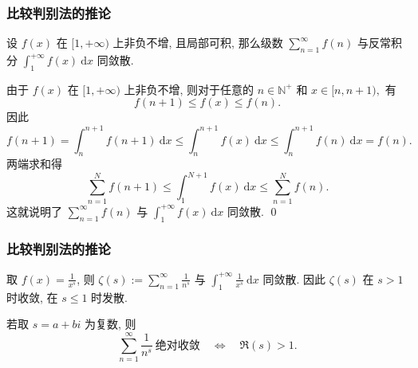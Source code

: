 
\begin{frame}
\frametitle{比较判别法的推论}

\begin{cor}
设 $f(x)$ 在 $[1, +\infty)$ 上非负不增, 且局部可积, 那么级数 $\displaystyle \sum_{n=1}^{\infty} f(n)$ 与反常积分 $\displaystyle \int_1^{+\infty} f(x) ~ \mathrm{d} x$ 同敛散.
\end{cor}

\pause

\startproof[bg=yellow, fg=red]
由于 $f(x)$ 在 $[1, +\infty)$ 上非负不增, 则对于任意的 $n \in \mathbb{N}^+$ 和 $x \in [n, n+1),$ 有
\[
f(n+1) \leqslant f(x) \leqslant f(n).
\]
因此
\[
f(n+1) = \int_n^{n+1} f(n+1) ~ \mathrm{d} x \leqslant \int_n^{n+1} f(x) ~ \mathrm{d} x \leqslant \int_n^{n+1} f(n) ~ \mathrm{d} x = f(n).
\]
两端求和得
\[
\sum_{n=1}^{N} f(n+1) \leqslant \int_1^{N+1} f(x) ~ \mathrm{d} x \leqslant \sum_{n=1}^{N} f(n).
\]
这就说明了 $\displaystyle \sum_{n=1}^{\infty} f(n)$ 与 $\displaystyle \int_1^{+\infty} f(x) ~ \mathrm{d} x$ 同敛散.
\qed

\end{frame}


\begin{frame}
\frametitle{比较判别法的推论}

\begin{cor}
取 $f(x) = \frac{1}{x^s}$, 则 $\displaystyle \zeta(s) := \sum_{n=1}^{\infty} \frac{1}{n^s}$ 与 $\displaystyle \int_1^{+\infty} \frac{1}{x^s} ~ \mathrm{d} x$ 同敛散. 因此 $\zeta(s)$ 在 $s > 1$ 时收敛, 在 $s \leqslant 1$ 时发散.
\end{cor}

\pause
\vspace{0.5em}

若取 $s = a + bi$ 为复数, 则
\[
\sum_{n=1}^{\infty} \frac{1}{n^s} ~ \text{绝对收敛} \quad \Longleftrightarrow \quad \Re(s) > 1.
\]

\end{frame}


